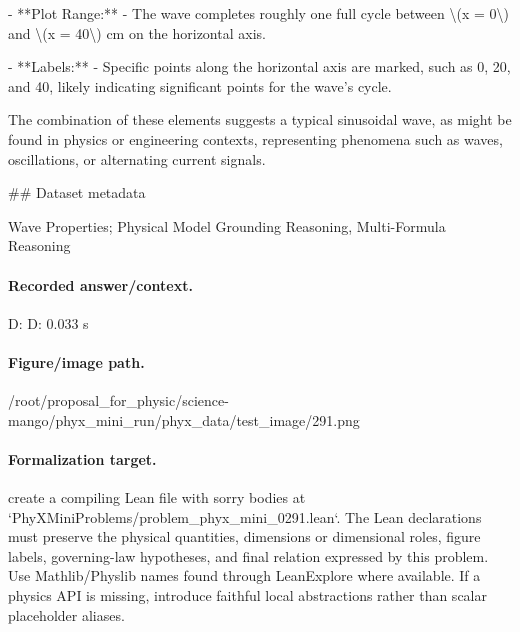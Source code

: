 - **Plot Range:**
  - The wave completes roughly one full cycle between \textbackslash{}(x = 0\textbackslash{}) and \textbackslash{}(x = 40\textbackslash{}) cm on the horizontal axis.

- **Labels:**
  - Specific points along the horizontal axis are marked, such as 0, 20, and 40, likely indicating significant points for the wave's cycle.

The combination of these elements suggests a typical sinusoidal wave, as might be found in physics or engineering contexts, representing phenomena such as waves, oscillations, or alternating current signals.

\#\# Dataset metadata

Wave Properties; Physical Model Grounding Reasoning, Multi-Formula Reasoning

\paragraph{Recorded answer/context.}
D: D: 0.033 s

\paragraph{Figure/image path.}
/root/proposal\_for\_physic/science-mango/phyx\_mini\_run/phyx\_data/test\_image/291.png

\paragraph{Formalization target.}
create a compiling Lean file with sorry bodies at `PhyXMiniProblems/problem\_phyx\_mini\_0291.lean`. The Lean declarations must preserve the physical quantities, dimensions or dimensional roles, figure labels, governing-law hypotheses, and final relation expressed by this problem.
Use Mathlib/Physlib names found through LeanExplore where available. If a physics API is missing, introduce faithful local abstractions rather than scalar placeholder aliases.

